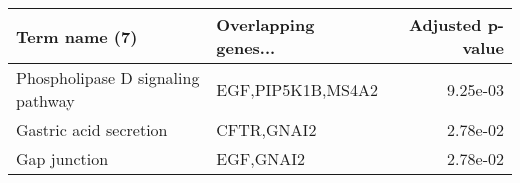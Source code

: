 \begin{tabular}{llr}
\toprule
                    Term name (7) & Overlapping genes... &  Adjusted p-value \\
\midrule
Phospholipase D signaling pathway &    EGF,PIP5K1B,MS4A2 &          9.25e-03 \\
           Gastric acid secretion &           CFTR,GNAI2 &          2.78e-02 \\
                     Gap junction &            EGF,GNAI2 &          2.78e-02 \\
\bottomrule
\end{tabular}
